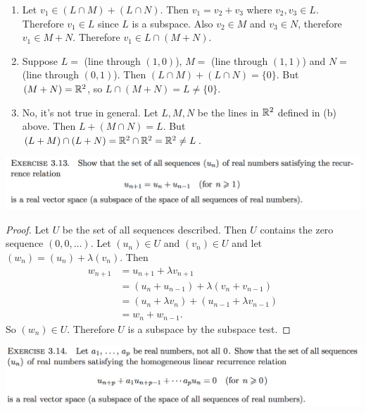 \documentclass[12pt]{article}
\begin{document}
\begin{enumerate}[label=(\alph*)]
\item Let $v_1 \in (L \cap M) + (L \cap N)$. Then $v_1 = v_2 + v_3$ where
  $v_2, v_3 \in L$. Therefore $v_1 \in L$ since $L$ is a subspace. Also
  $v_2 \in M$ and $v_3 \in N$, therefore $v_1 \in M + N$. Therefore
  $v_1 \in L \cap (M + N)$.

\item Suppose $L =$ (line through $(1, 0)$), $M =$ (line through $(1,1)$) and
  $N = $ (line through $(0, 1)$). Then $(L \cap M) + (L \cap N) = \{0\}$. But
  $(M + N) = \mathbb{R}^2$, so $L \cap (M + N) = L \neq \{0\}$.

\item No, it's not true in general. Let $L, M, N$ be the lines in $\mathbb{R}^2$
  defined in (b) above. Then $L + (M \cap N) = L$. But
  $(L + M) \cap (L + N) = \mathbb{R}^2 \cap \mathbb{R}^2 = \mathbb{R}^2 \neq L$.
\end{enumerate}

\begin{mdframed}
\includegraphics[width=400pt]{img/oxford-prelims-M1-linear-algebra-3-13.png}
\end{mdframed}

\begin{proof}
  Let $U$ be the set of all sequences described. Then $U$ contains the zero
  sequence $(0, 0, \ldots)$. Let $(u_n) \in U$ and $(v_n) \in U$ and let
  $(w_n) = (u_n) + \lambda(v_n)$. Then
  \begin{align*}
    w_{n+1} &= u_{n+1} + \lambda v_{n+1}\\
            &= (u_n + u_{n-1}) + \lambda (v_n + v_{n-1})\\
            &= (u_n + \lambda v_n) + (u_{n-1} + \lambda v_{n-1})\\
            &= w_n + w_{n-1}.
  \end{align*}
  So $(w_n) \in U$. Therefore $U$ is a subspace by the subspace test.
\end{proof}

\begin{mdframed}
\includegraphics[width=400pt]{img/oxford-prelims-M1-linear-algebra-3-14.png}
\end{mdframed}
\end{document}
